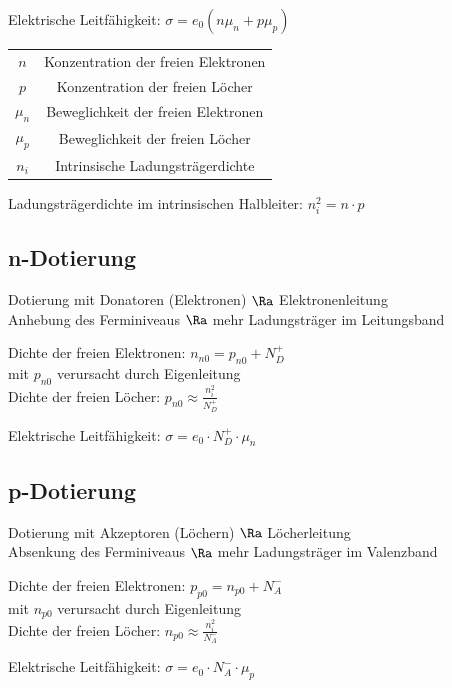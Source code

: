 \documentclass[fs, german]{latex4ei_fs}
\begin{document}
\begin{sectionbox}
Elektrische Leitfähigkeit:
$\sigma = e_0 (n \mu_n + p \mu_p)$

\begin{symbolbox}
\begin{tabular}{cc}
$n$ & Konzentration der freien Elektronen \\
$p$ & Konzentration der freien Löcher \\
$\mu_n$ & Beweglichkeit der freien Elektronen \\
$\mu_p$ & Beweglichkeit der freien Löcher \\
$n_i$ & Intrinsische Ladungsträgerdichte
 \end{tabular}
\end{symbolbox}

Ladungsträgerdichte im intrinsischen Halbleiter:
 $n_i^2 = n \cdot p$
\end{sectionbox}
\begin{sectionbox}
 \subsection{n-Dotierung}
 Dotierung mit Donatoren (Elektronen) $\Ra$ Elektronenleitung \\

Anhebung des Ferminiveaus $\Ra$ mehr Ladungsträger im Leitungsband

Dichte der freien Elektronen: $n_{n0} = p_{n0} + N_D^+$ \\
mit $p_{n0}$ verursacht durch Eigenleitung \\

Dichte der freien Löcher: $p_{n0} \approx \frac{n_i^2}{N_D^+}$

Elektrische Leitfähigkeit: $\sigma = e_0 \cdot N_D^+ \cdot \mu_n$
\end{sectionbox}
\begin{sectionbox}

 \subsection{p-Dotierung}
Dotierung mit Akzeptoren (Löchern) $\Ra$ Löcherleitung \\

Absenkung des Ferminiveaus $\Ra$ mehr Ladungsträger im Valenzband

Dichte der freien Elektronen: $p_{p0} = n_{p0} + N_A^-$ \\
mit $n_{p0}$ verursacht durch Eigenleitung \\

Dichte der freien Löcher: $n_{p0} \approx \frac{n_i^2}{N_A^-}$

Elektrische Leitfähigkeit: $\sigma = e_0 \cdot N_A^- \cdot \mu_p$

\end{sectionbox}
\end{document}
